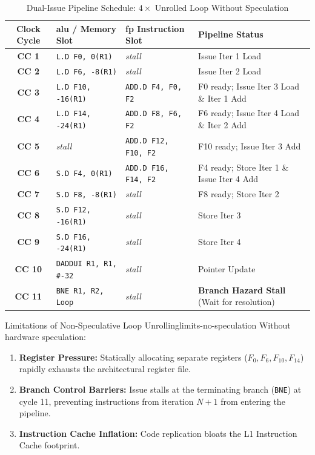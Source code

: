 \begin{table}[htbp]
\centering
\caption{Dual-Issue Pipeline Schedule: $4\times$ Unrolled Loop Without Speculation}
\label{tab:schedule_no_speculation}
\small
\setlength{\tabcolsep}{4pt}
\begin{tabularx}{\textwidth}{|c|>{\hsize=1.1\hsize\raggedright\arraybackslash}X|>{\hsize=1.1\hsize\raggedright\arraybackslash}X|>{\hsize=0.8\hsize\raggedright\arraybackslash}X|}
\hline
\textbf{Clock Cycle} & \textbf{\gls{alu} / Memory Slot} & \textbf{\gls{fp} Instruction Slot} & \textbf{Pipeline Status} \\ \hline
\textbf{CC 1} & \texttt{L.D F0, 0(R1)} & \textit{stall} & Issue Iter 1 Load \\ \hline
\textbf{CC 2} & \texttt{L.D F6, -8(R1)} & \textit{stall} & Issue Iter 2 Load \\ \hline
\textbf{CC 3} & \texttt{L.D F10, -16(R1)} & \texttt{ADD.D F4, F0, F2} & F0 ready; Issue Iter 3 Load \& Iter 1 Add \\ \hline
\textbf{CC 4} & \texttt{L.D F14, -24(R1)} & \texttt{ADD.D F8, F6, F2} & F6 ready; Issue Iter 4 Load \& Iter 2 Add \\ \hline
\textbf{CC 5} & \textit{stall} & \texttt{ADD.D F12, F10, F2} & F10 ready; Issue Iter 3 Add \\ \hline
\textbf{CC 6} & \texttt{S.D F4, 0(R1)} & \texttt{ADD.D F16, F14, F2} & F4 ready; Store Iter 1 \& Issue Iter 4 Add \\ \hline
\textbf{CC 7} & \texttt{S.D F8, -8(R1)} & \textit{stall} & F8 ready; Store Iter 2 \\ \hline
\textbf{CC 8} & \texttt{S.D F12, -16(R1)} & \textit{stall} & Store Iter 3 \\ \hline
\textbf{CC 9} & \texttt{S.D F16, -24(R1)} & \textit{stall} & Store Iter 4 \\ \hline
\textbf{CC 10} & \texttt{DADDUI R1, R1, \#-32} & \textit{stall} & Pointer Update \\ \hline
\textbf{CC 11} & \texttt{BNE R1, R2, Loop} & \textit{stall} & \textbf{Branch Hazard Stall} (Wait for resolution) \\ \hline
\end{tabularx}
\end{table}

\begin{observation}{Limitations of Non-Speculative Loop Unrolling}{limits-no-speculation}
Without hardware speculation:
\begin{enumerate}
    \item \textbf{Register Pressure:} Statically allocating separate registers ($F_0, F_6, F_{10}, F_{14}$) rapidly exhausts the architectural register file.
    \item \textbf{Branch Control Barriers:} Issue stalls at the terminating branch (\texttt{BNE}) at cycle 11, preventing instructions from iteration $N+1$ from entering the pipeline.
    \item \textbf{Instruction Cache Inflation:} Code replication bloats the L1 Instruction Cache footprint.
\end{enumerate}
\end{observation}

